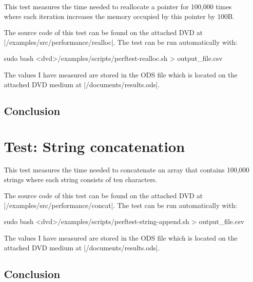 This test measures the time needed to reallocate a pointer for 100,000 times
where each iteration increases the memory occupied by this pointer by 100B.

\funclistend
The source code of this test can be found on the attached DVD at
|/examples/src/performance/realloc|. The test can be run automatically with:
\begin{commandline}
sudo bash <dvd>/examples/scripts/perftest-realloc.sh > output_file.csv
\end{commandline}
\funclistend
The values I have measured are stored in the ODS file which is located on the
attached DVD medium at |/documents/results.ods|.

\subsection{Conclusion}

\section{Test: String concatenation}

This test measures the time needed to concatenate an array that contains
100,000 strings where each string consists of ten characters.

\funclistend
The source code of this test can be found on the attached DVD at
|/examples/src/performance/concat|. The test can be run automatically
with:
\begin{commandline}
sudo bash <dvd>/examples/scripts/perftest-string-append.sh > output_file.csv
\end{commandline}
\funclistend
The values I have measured are stored in the ODS file which is located on the
attached DVD medium at |/documents/results.ods|.

\subsection{Conclusion}

